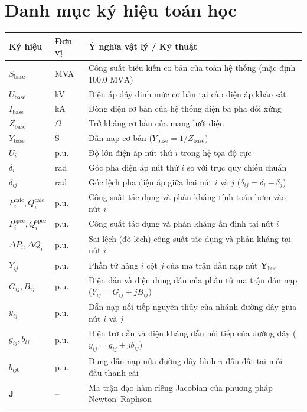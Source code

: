 \documentclass[12pt,a4paper,oneside]{report}
\begin{document}
\vspace{15pt}
\section*{Danh mục ký hiệu toán học}
\begin{longtable}{p{2.2cm}p{1.5cm}p{10.5cm}}
\toprule
\textbf{Ký hiệu} & \textbf{Đơn vị} & \textbf{Ý nghĩa vật lý / Kỹ thuật} \\
\midrule
$S_{\text{base}}$ & MVA & Công suất biểu kiến cơ bản của toàn hệ thống (mặc định $100.0\text{ MVA}$) \\
$U_{\text{base}}$ & kV & Điện áp dây định mức cơ bản tại cấp điện áp khảo sát \\
$I_{\text{base}}$ & kA & Dòng điện cơ bản của hệ thống điện ba pha đối xứng \\
$Z_{\text{base}}$ & $\Omega$ & Trở kháng cơ bản của mạng lưới điện \\
$Y_{\text{base}}$ & S & Dẫn nạp cơ bản ($Y_{\text{base}} = 1 / Z_{\text{base}}$) \\
$U_i$ & p.u. & Độ lớn điện áp nút thứ $i$ trong hệ tọa độ cực \\
$\delta_i$ & rad & Góc pha điện áp nút thứ $i$ so với trục quy chiếu chuẩn \\
$\delta_{ij}$ & rad & Góc lệch pha điện áp giữa hai nút $i$ và $j$ ($\delta_{ij} = \delta_i - \delta_j$) \\
$P_i^{\text{calc}}, Q_i^{\text{calc}}$ & p.u. & Công suất tác dụng và phản kháng tính toán bơm vào nút $i$ \\
$P_i^{\text{spec}}, Q_i^{\text{spec}}$ & p.u. & Công suất tác dụng và phản kháng ấn định tại nút $i$ \\
$\Delta P_i, \Delta Q_i$ & p.u. & Sai lệch (độ lệch) công suất tác dụng và phản kháng tại nút $i$ \\
$Y_{ij}$ & p.u. & Phần tử hàng $i$ cột $j$ của ma trận dẫn nạp nút $\mathbf{Y}_{\text{bus}}$ \\
$G_{ij}, B_{ij}$ & p.u. & Điện dẫn và điện dung dẫn của phần tử ma trận dẫn nạp ($Y_{ij} = G_{ij} + jB_{ij}$) \\
$y_{ij}$ & p.u. & Dẫn nạp nối tiếp nguyên thủy của nhánh đường dây giữa nút $i$ và $j$ \\
$g_{ij}, b_{ij}$ & p.u. & Điện trở dẫn và điện kháng dẫn nối tiếp của đường dây ($y_{ij} = g_{ij} + jb_{ij}$) \\
$b_{ij0}$ & p.u. & Dung dẫn nạp nửa đường dây hình $\pi$ đấu đất tại mỗi đầu thanh cái \\
$\mathbf{J}$ & -- & Ma trận đạo hàm riêng Jacobian của phương pháp Newton--Raphson \\

\end{longtable}
\end{document}
